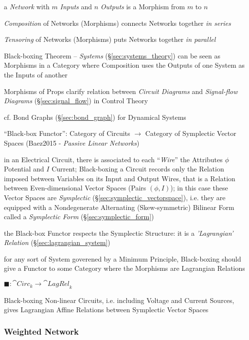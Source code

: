 a \emph{Network} with $m$ \emph{Inputs} and $n$ \emph{Outputs} is a Morphism
from $m$ to $n$

\emph{Composition} of Networks (Morphisms) connects Networks together \emph{in
  series}

\emph{Tensoring} of Networks (Morphisms) puts Networks together \emph{in
  parallel}

Black-boxing Theorem -- \emph{Systems} (\S\ref{sec:systems_theory}) can be seen
as Morphisms in a Category where Composition uses the Outputs of one System as
the Inputs of another

Morphisms of Props clarify relation between \emph{Circuit Diagrams} and
\emph{Signal-flow Diagrams} (\S\ref{sec:signal_flow}) in Control Theory

cf. Bond Graphs (\S\ref{sec:bond_graph}) for Dynamical Systems

``Black-box Functor'': Category of Circuits $\rightarrow$ Category of
Symplectic Vector Spaces (Baez2015 - \emph{Passive Linear Networks})

in an Electrical Circuit, there is associated to each ``\emph{Wire}'' the
Attributes $\phi$ Potential and $I$ Current; Black-boxing a Circuit records
only the Relation imposed between Variables on its Input and Output Wires, that
is a Relation between Even-dimensional Vector Spaces (Pairs $(\phi,I)$); in
this case these Vector Spaces are \emph{Symplectic}
(\S\ref{sec:symplectic_vectorspace}), i.e. they are equipped with a
Nondegenerate Alternating (Skew-symmetric) Bilinear Form
called a \emph{Symplectic Form} (\S\ref{sec:symplectic_form})

the Black-box Functor respects the Symplectic Structure: it is a
\emph{'Lagrangian' Relation} (\S\ref{sec:lagrangian_system})

for any sort of System goverened by a Minimum Principle, Black-boxing should
give a Functor to some Category where the Morphisms are Lagrangian Relations

$\blacksquare : \cat{Circ}_k \rightarrow \cat{LagRel}_k$

Black-boxing Non-linear Circuits, i.e. including Voltage and Current Sources,
gives Lagrangian Affine Relations between Symplectic Vector Spaces



\subsubsection{Weighted Network}\label{sec:weighted_network}

